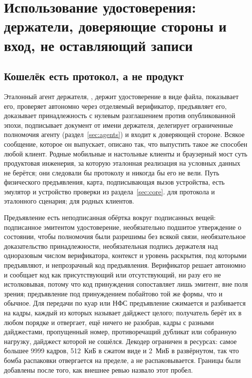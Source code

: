 \section{Использование удостоверения: держатели, доверяющие стороны и вход, не оставляющий записи}
\label{sec:use}



\subsection{Кошелёк есть протокол, а не продукт}

Эталонный агент держателя, , держит удостоверение в виде файла,
показывает его, проверяет автономно через отделяемый верификатор, предъявляет его, доказывает
принадлежность с нулевым разглашением против опубликованной эпохи, подписывает документ от имени
держателя, делегирует ограниченные полномочия агенту (раздел~\ref{sec:agents}) и входит к
доверяющей стороне. Всякое сообщение, которое он выпускает, описано так, что выпустить такое же
способен любой клиент. Родные мобильные и настольные клиенты и браузерный мост суть продуктовая
инженерия, за которую эталонная реализация на условных данных не берётся; они следовали бы
протоколу и никогда бы его не вели. Путь физического предъявления, карта, подписывающая вызов
устройства, есть эмулятор и устройство проверки из раздела~\ref{sec:core}. \sImplMark{} для протокола
и эталонного сценария; \sFut{} для родных клиентов.

Предъявление есть неподписанная обёртка вокруг подписанных вещей: подписанное эмитентом
удостоверение, необязательно подшитое утверждение о состоянии, чтобы полномочия были разрешимы без
всякой связи, необязательное доказательство принадлежности, необязательная подпись держателя над
одноразовым числом верификатора, контекст и уровень раскрытия, под которыми предъявляют, и
непрозрачный код предъявления. Верификатор решает автономно и сообщает код как присутствующий или
отсутствующий, ни разу его не истолковывая, потому что код принуждения сопоставляет лишь эмитент,
вне поля зрения; предъявление под принуждением побайтово той же формы, что и обычное. Для передачи
по куар или НФС предъявление сжимается и разбивается на кадры, каждый из которых называет дайджест
целого; получатель берёт их в любом порядке и отвергает, ещё ничего не разобрав, кадры с разными
дайджестами, пропущенный номер, противоречащий дубликат или собранную нагрузку, дайджест которой не
сошёлся. Декодер ограничен в ресурсах: самое большее 9999 кадров, 512~КиБ в сжатом виде и 2~МиБ в
развёрнутом, так что бомба распаковки отвергается на пределе, а не распаковывается. Границы были
добавлены после того, как внешнее ревью назвало этот пробел. \sImpl

